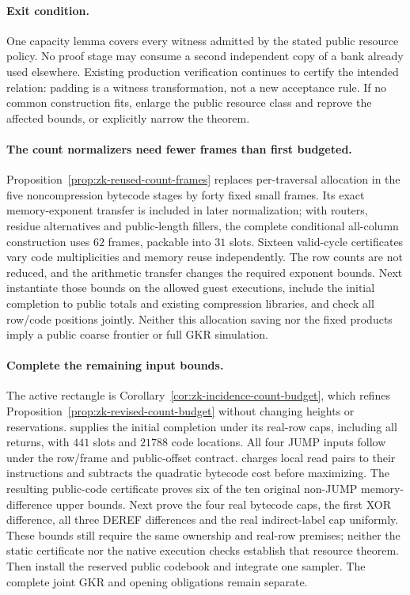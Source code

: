\paragraph{Exit condition.} One capacity lemma covers every witness admitted by the stated public resource policy. No proof stage may consume a second independent copy of a bank already used elsewhere. Existing production verification continues to certify the intended relation: padding is a witness transformation, not a new acceptance rule. If no common construction fits, enlarge the public resource class and reprove the affected bounds, or explicitly narrow the theorem.

\paragraph{The count normalizers need fewer frames than first budgeted.} Proposition~\ref{prop:zk-reused-count-frames} replaces per-traversal allocation in the five noncompression bytecode stages by forty fixed small frames. Its exact memory-exponent transfer is included in later normalization; with routers, residue alternatives and public-length fillers, the complete conditional all-column construction uses $62$ frames, packable into $31$ slots. Sixteen valid-cycle certificates vary code multiplicities and memory reuse independently. The row counts are not reduced, and the arithmetic transfer changes the required exponent bounds. Next instantiate those bounds on the allowed guest executions, include the initial completion to public totals and existing compression libraries, and check all row/code positions jointly. Neither this allocation saving nor the fixed products imply a public coarse frontier or full GKR simulation.

\paragraph{Complete the remaining input bounds.} The active rectangle is Corollary~\ref{cor:zk-incidence-count-budget}, which refines Proposition~\ref{prop:zk-revised-count-budget} without changing heights or reservations.  supplies the initial completion under its real-row caps, including all returns, with $441$ slots and $21788$ code locations. All four JUMP inputs follow under the row/frame and public-offset contract.  charges local read pairs to their instructions and subtracts the quadratic bytecode cost before maximizing. The resulting public-code certificate proves six of the ten original non-JUMP memory-difference upper bounds. Next prove the four real bytecode caps, the first XOR difference, all three DEREF differences and the real indirect-label cap uniformly. These bounds still require the same ownership and real-row premises; neither the static certificate nor the native execution checks establish that resource theorem. Then install the reserved public codebook and integrate one sampler. The complete joint GKR and opening obligations remain separate.

